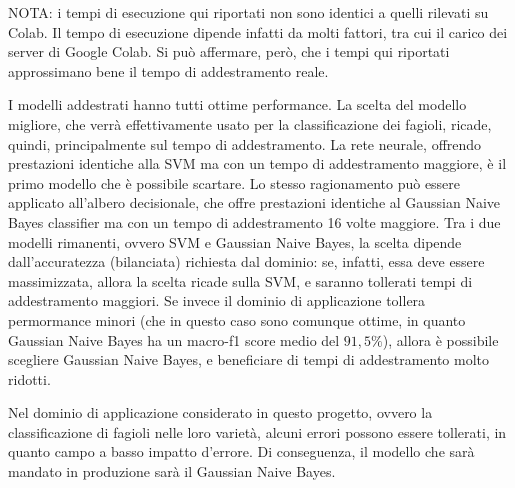 NOTA: i tempi di esecuzione qui riportati non sono identici a quelli rilevati
su Colab. Il tempo di esecuzione dipende infatti da molti fattori, tra cui il 
carico dei server di Google Colab. Si può affermare, però, che i tempi qui
riportati approssimano bene il tempo di addestramento reale.

I modelli addestrati hanno tutti ottime performance. La scelta del modello migliore,
che verrà effettivamente usato per la classificazione dei fagioli,
ricade, quindi, principalmente sul tempo di addestramento.
La rete neurale, offrendo prestazioni identiche alla SVM ma con un tempo 
di addestramento maggiore, è il primo modello che è possibile scartare.
Lo stesso ragionamento può essere applicato all'albero decisionale, che offre
prestazioni identiche al Gaussian Naive Bayes classifier ma con un tempo di addestramento
16 volte maggiore.
Tra i due modelli rimanenti, ovvero SVM e Gaussian Naive Bayes, la scelta dipende
dall'accuratezza (bilanciata) richiesta dal dominio: se, infatti, essa deve essere
massimizzata, allora la scelta ricade sulla SVM, e saranno tollerati
tempi di addestramento maggiori.
Se invece il dominio di applicazione tollera permormance minori (che in questo
caso sono comunque ottime, in quanto Gaussian Naive Bayes ha un
macro-f1 score medio del $91,5\%$), allora è possibile scegliere Gaussian Naive Bayes,
e beneficiare di tempi di addestramento molto ridotti.

Nel dominio di applicazione considerato in questo progetto, ovvero la classificazione
di fagioli nelle loro varietà, alcuni errori possono essere tollerati, 
in quanto campo a basso impatto d'errore. Di conseguenza, il modello che
sarà mandato in produzione sarà il Gaussian Naive Bayes.